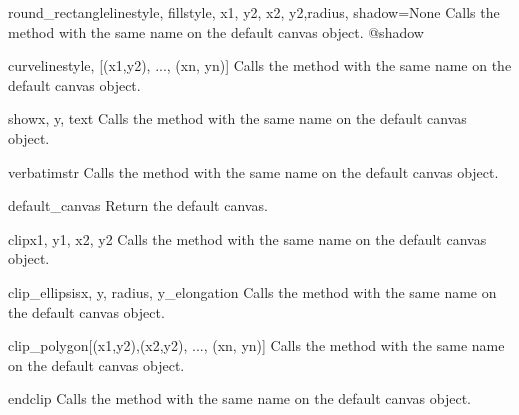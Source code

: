 \documentclass{howto}
\begin{document}
\begin{funcdesc}{round_rectangle}{linestyle, fillstyle, x1, y2, x2, y2,radius, shadow=None}
Calls the method with the same name on the default canvas object.
@shadow
\end{funcdesc}

\begin{funcdesc}{curve}{linestyle, [(x1,y2), ..., (xn, yn)]}
Calls the method with the same name on the default canvas object.
\end{funcdesc}

\begin{funcdesc}{show}{x, y, text}
Calls the method with the same name on the default canvas object.
\end{funcdesc}

\begin{funcdesc}{verbatim}{str}
Calls the method with the same name on the default canvas object.
\end{funcdesc}

\begin{funcdesc}{default_canvas}{}
  Return the default canvas.
\end{funcdesc}

\begin{funcdesc}{clip}{x1, y1, x2, y2}
Calls the method with the same name on the default canvas object.
\end{funcdesc}

\begin{funcdesc}{clip_ellipsis}{x, y, radius, y_elongation}
Calls the method with the same name on the default canvas object.
\end{funcdesc}

\begin{funcdesc}{clip_polygon}{[(x1,y2),(x2,y2), ..., (xn, yn)]}
Calls the method with the same name on the default canvas object.
\end{funcdesc}

\begin{funcdesc}{endclip}{}
Calls the method with the same name on the default canvas object.
\end{funcdesc}


\end{document}
